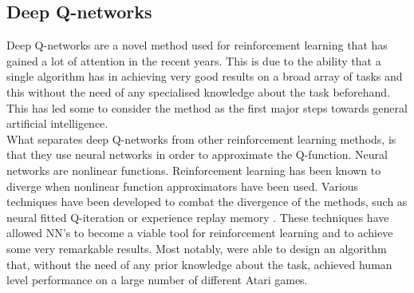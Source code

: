\subsection{Deep Q-networks}
Deep Q-networks\cite{mnih2013playing} are a novel method used for reinforcement learning that has gained a lot of attention in the recent years. This is due to the ability that a single algorithm has in achieving very good results on a broad array of tasks and this without the need of any specialised knowledge about the task beforehand. This has led some to consider the method as the first major steps towards general artificial intelligence.\\
What separates deep Q-networks from other reinforcement learning methods, is that they use neural networks in order to approximate the Q-function. Neural networks are nonlinear functions. Reinforcement learning has been known to diverge when nonlinear function approximators have been used. Various techniques have been developed to combat the divergence of the methods, such as neural fitted Q-iteration \cite{riedmiller2005neural} or experience replay memory \cite{Mnih2015}. These techniques have allowed NN's to become a viable tool for reinforcement learning and to achieve some very remarkable results. Most notably, \cite{Mnih2015} were able to design an algorithm that, without the need of any prior knowledge about the task, achieved human level performance on a large number of different Atari games.

































